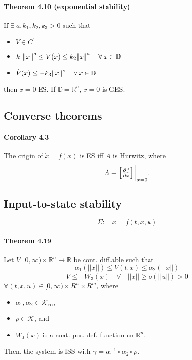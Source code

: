 \paragraph{Theorem 4.10 (exponential stability)}
If $\exists \: a, k_1, k_2, k_3 > 0$ such that
\begin{itemize}
	\item $V \in C^1$
	\item $k_1 \norm{x}^a \leq V(x) \leq k_2 \norm{x}^a \quad \forall \: x \in \mathbb{D}$
	\item $\dot{V}(x) \leq - k_3 \norm{x}^a \quad \forall \: x \in \mathbb{D}$
\end{itemize}
then $x = 0$ ES. If $\mathbb{D} = \mathbb{R}^n$, $x = 0$ is GES.

\subsection{Converse theorems}
\paragraph{Corollary 4.3}
The origin of $\dot{x} = f(x)$ is ES iff $A$ is Hurwitz, where
\begin{equation}
	A =
	\begin{bmatrix}
		\pd{f}{x}
	\end{bmatrix}
	\bigg\rvert_{x=0}
	.
\end{equation}

\subsection{Input-to-state stability}
\begin{equation}\label{eq:iss-system}
	\Sigma: \quad \dot{x} = f(t,x,u)
\end{equation}

\paragraph{Theorem 4.19}
Let $V : [0,\infty) \times \mathbb{R}^n \to \mathbb{R}$ be cont. diff.able such that
\begin{equation}
	\alpha_1 \left( ||x|| \right) \leq V(t,x) \leq \alpha_2 \left( ||x|| \right)
\end{equation}
\begin{equation}
	\dot{V} \leq -W_3(x) \quad \forall \quad ||x|| \geq \rho \left( ||u|| \right) > 0
\end{equation}
$\forall (t,x,u) \in [0,\infty) \times R^n \times R^m$, where
\begin{itemize}
	\item $\alpha_1, \alpha_2 \in \mathcal{K}_\infty$,
	\item $\rho \in \mathcal{K}$, and
	\item $W_3(x)$ is a cont. pos. def. function on $\mathbb{R}^n$.
\end{itemize}
Then, the system is ISS with $\gamma=\alpha_1^{-1} \circ \alpha_2 \circ \rho$.

